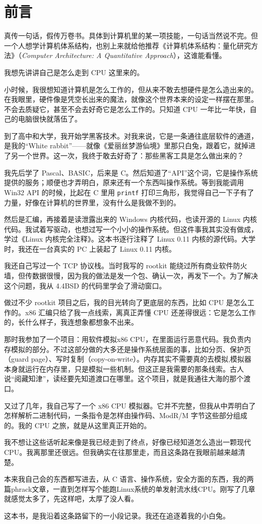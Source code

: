 \chapter{前言}

真传一句话，假传万卷书。具体到计算机里的某一项技能，一句话当然说不完。但一个人想学计算机体系结构，也别上来就给他推荐《计算机体系结构：量化研究方法》（\emph{Computer Architecture: A Quantitative Approach}），这谁能看懂。

我想先讲讲自己是怎么走到 CPU 这里来的。

小时候，我很想知道计算机是怎么工作的，但从来不敢去想硬件是怎么造出来的。在我眼里，硬件像是凭空长出来的魔法，就像这个世界本来的设定一样摆在那里。不会去质疑它，甚至不会去好奇它是怎么工作的。只知道 CPU 一年比一年快，自己的电脑很快就落伍了。

到了高中和大学，我开始学黑客技术。对我来说，它是一条通往底层软件的通道，是我的“White rabbit”——就像《爱丽丝梦游仙境》里那只白兔，跟着它，就掉进了另一个世界。这一次，我终于敢去好奇了：那些黑客工具是怎么做出来的？

我先后学了 Pascal、BASIC，后来是 C。然后知道了“API”这个词，它是操作系统提供的服务；顺便也才弄明白，原来还有一个东西叫操作系统。等到我能调用 Win32 API 的时候，比起在 C 里用 \texttt{printf} 打印三角形，我觉得自己一下子有了力量，好像在计算机的世界里，没有什么是我做不到的。

然后是汇编，再接着是读泄露出来的 Windows 内核代码，也读开源的 Linux 内核代码。我试着写驱动，也想过写一个小小的操作系统。但这件事我其实没有做成，学过《Linux 内核完全注释》。这本书逐行注释了 Linux 0.11 内核的源代码。大学时，我还在一台真实的 PC 上装起了 Linux 0.11 内核。

我还自己写过一个 TCP 协议栈。当时我写的 rootkit 能绕过所有商业软件防火墙，但传数据很慢，因为我的做法是发一个包、确认一次，再发下一个。为了解决这个问题，我从 4.4BSD 的代码里学会了滑动窗口。

做过不少 rootkit 项目之后，我的目光转向了更底层的东西，比如 CPU 是怎么工作的。x86 汇编只给了我一点线索，离真正弄懂 CPU 还差得很远：它是怎么工作的，长什么样子，我连想象都想象不出来。

那时我参加了一个项目：用软件模拟x86 CPU，在里面运行恶意代码。我负责内存模拟的部分。不过这部分做的大多还是操作系统层面的事，比如分页、保护页（guard page）、写时复制（copy-on-write）。内存其实不需要真的去模拟,模拟器本身就运行在内存里，只是模拟一些机制。但这正是我需要的那条线索。古人说“阅藏知津”，读经要先知道渡口在哪里。这个项目，就是我通往大海的那个渡口。

又过了几年，我自己写了一个 x86 CPU 模拟器。它并不完整，但我从中弄明白了怎样解析二进制代码，一条指令是怎样由操作码、ModR/M 字节这些部分组成的。我的 CPU 之旅，就是从这里真正开始的。

我不想让这些话听起来像是我已经走到了终点，好像已经知道怎么造出一颗现代 CPU。我离那里还很远。但我确实在往那里走，而且这条路在我眼前越来越清楚。

本来我自己会的东西都写进去，从 C 语言、操作系统，安全方面的东西，我的两篇phrack文章，一直到怎样写个能跑Linux系统的单发射流水线CPU。刚写了几章就感觉太多了，先这样吧，太厚了没人看。

这本书，是我沿着这条路留下的一小段记录。我还在追逐着我的小白兔。
